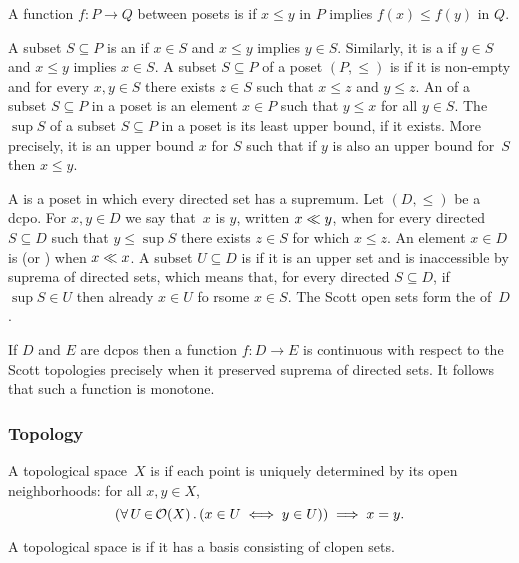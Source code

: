 A function $f : P \to Q$ between posets is  if $x \leq
y$ in $P$ implies $f(x) \leq f(y)$ in $Q$.

A subset $S \subseteq P$ is an  if $x \in S$ and $x
\leq y$ implies $y \in S$. Similarly, it is a  if $y
\in S$ and $x \leq y$ implies $x \in S$.
%
A subset $S \subseteq P$ of a poset $(P, {\leq})$ is 
if it is non-empty and for every $x, y \in S$ there exists $z \in S$
such that $x \leq z$ and $y \leq z$.
%
An  of a subset $S \subseteq P$ in a poset is an
element $x \in P$ such that $y \leq x$ for all $y \in S$.
%
The  $\sup S$ of a subset $S \subseteq P$ in a poset is
its least upper bound, if it exists. More precisely, it is an upper
bound $x$ for $S$ such that if $y$ is also an upper bound for~$S$ then
$x \leq y$.

A  is a poset in which
every directed set has a supremum. Let $(D, {\leq})$ be a dcpo. For
$x, y \in D$ we say that~$x$ is  $y$, written $x \ll
y$, when for every directed $S \subseteq D$ such that $y \leq \sup S$
there exists $z \in S$ for which $x \leq z$. An element $x \in D$ is
 (or ) when $x \ll x$. A subset $U
\subseteq D$ is  if it is an upper set and is
inaccessible by suprema of directed sets, which means that, for every
directed $S \subseteq D$, if $\sup S \in U$ then already $x \in U$ fo
rsome $x \in S$. The Scott open sets form the 
of~$D$.

If $D$ and $E$ are dcpos then a function $f : D \to E$ is continuous
with respect to the Scott topologies precisely when it preserved
suprema of directed sets. It follows that such a function is monotone.


\subsubsection*{Topology}

A topological space~$X$ is  if each point is
uniquely determined by its open neighborhoods: for all $x, y \in
X$,
%
\begin{equation*}
  (\forall\, U \,{\in}\, \mathcal{O}(X)\,.\left(x \in U \iff y \in U\right)) \implies x = y.
\end{equation*}

A topological space is  if it has a basis
consisting of clopen sets.






